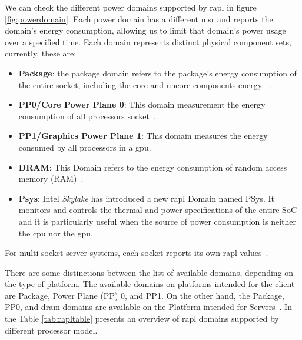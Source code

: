     We can check the different power domains supported by \gls{rapl} in figure \ref{fig:powerdomain}. Each power domain has a different  \gls{msr}  and reports the domain's energy consumption, allowing us to limit that domain's power usage over a specified time. Each domain represents distinct physical component sets, currently, these are: 
    
    \begin{itemize}
        \item \textbf{Package}: the package domain refers to the package's energy consumption of the entire socket, including the core and uncore components energy ~\cite{intel64and}.
        \item \textbf{PP0/Core Power Plane 0}: This domain measurement the energy consumption of all processors socket~\cite{intel64and,portela2016}.
            \item \textbf{PP1/Graphics Power Plane 1}: This domain measures the energy consumed by all processors in a \gls{gpu}.
        \item \textbf{DRAM}: This Domain refers to the energy consumption of random access memory (RAM)~\cite{intel64and,portela2016}.
        \item \textbf{Psys}: Intel \textit{Skylake} has introduced a new \gls{rapl} Domain named PSys. It monitors and controls the thermal and power specifications of the entire SoC and it is particularly useful when the source of power consumption is neither the \gls{cpu} nor the \gls{gpu}.~\cite{raplpref}
    \end{itemize}
    For multi-socket server systems, each socket reports its own \gls{rapl} values~\cite{raplpref}.
    
    There are some distinctions between the list of available domains, depending on the type of platform. The available domains on platforms intended for the client are Package, Power Plane (PP) 0, and PP1. On the other hand, the Package, PP0, and \gls{dram} domains are available on the Platform intended for Servers~\cite{raplpref2}.
    In the Table \ref{tab:rapltable} presents an overview of \gls{rapl} domains supported by different processor model.


